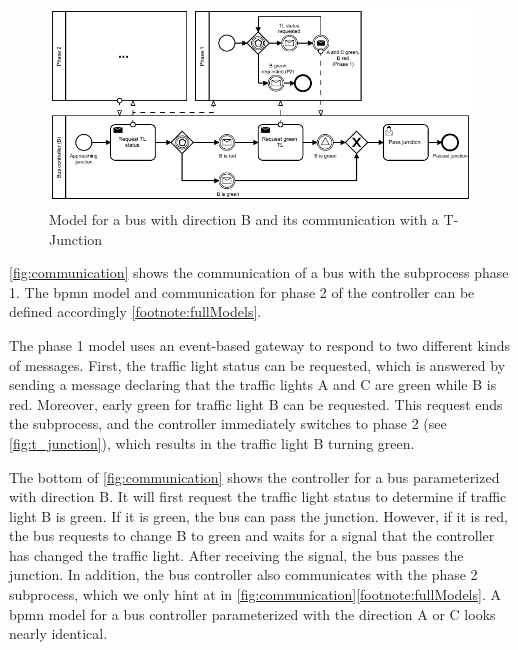 \documentclass{jot}
\begin{document}
\begin{figure}[h]
    \centering
    \includegraphics[width=1\textwidth]{figures/communication.pdf}
    \caption{Model for a bus with direction B and its communication with a T-Junction}
    \label{fig:communication}
\end{figure}

\autoref{fig:communication} shows the communication of a bus with the subprocess phase 1.
The \gls*{bpmn} model and communication for phase 2 of the controller can be defined accordingly \cref{footnote:fullModels}.

The phase 1 model uses an event-based gateway to respond to two different kinds of messages.
First, the traffic light status can be requested, which is answered by sending a message declaring that the traffic lights A and C are green while B is red.
Moreover, early green for traffic light B  can be requested.
This request ends the subprocess, and the controller immediately switches to phase 2 (see \autoref{fig:t_junction}), which results in the traffic light B turning green.

The bottom of \autoref{fig:communication} shows the controller for a bus parameterized with direction B.
It will first request the traffic light status to determine if traffic light B is green.
If it is green, the bus can pass the junction.
However, if it is red, the bus requests to change B to green and waits for a signal that the controller has changed the traffic light.
After receiving the signal, the bus passes the junction.
In addition, the bus controller also communicates with the phase 2 subprocess, which we only hint at in \autoref{fig:communication}\cref{footnote:fullModels}.
A \gls*{bpmn} model for a bus controller parameterized with the direction A or C looks nearly identical.
\end{document}
